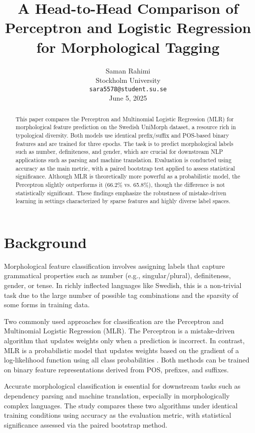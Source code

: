 \documentclass[11pt]{article}
\title{A Head-to-Head Comparison of Perceptron and Logistic Regression for Morphological Tagging}
\author{
  Saman Rahimi \\
  Stockholm University \\
  \texttt{sara5578@student.su.se} \\
  \textnormal{June 5, 2025}
}
\begin{document}
\maketitle

\begin{abstract}
This paper compares the Perceptron and Multinomial Logistic Regression (MLR) for morphological feature prediction on the Swedish UniMorph dataset, a resource rich in typological diversity. Both models use identical prefix/suffix and POS-based binary features and are trained for three epochs. The task is to predict morphological labels such as number, definiteness, and gender, which are crucial for downstream NLP applications such as parsing and machine translation. Evaluation is conducted using accuracy as the main metric, with a paired bootstrap test applied to assess statistical significance. Although MLR is theoretically more powerful as a probabilistic model, the Perceptron slightly outperforms it (66.2\% vs. 65.8\%), though the difference is not statistically significant. These findings emphasize the robustness of mistake-driven learning in settings characterized by sparse features and highly diverse label spaces.
\end{abstract}

\section{Background}
Morphological feature classification involves assigning labels that capture grammatical properties such as number (e.g., singular/plural), definiteness, gender, or tense. In richly inflected languages like Swedish, this is a non-trivial task due to the large number of possible tag combinations and the sparsity of some forms in training data.

Two commonly used approaches for classification are the Perceptron and Multinomial Logistic Regression (MLR). The Perceptron is a mistake-driven algorithm that updates weights only when a prediction is incorrect. In contrast, MLR is a probabilistic model that updates weights based on the gradient of a log-likelihood function using all class probabilities \cite{jurafsky2024slp3}. Both methods can be trained on binary feature representations derived from POS, prefixes, and suffixes.

Accurate morphological classification is essential for downstream tasks such as dependency parsing and machine translation, especially in morphologically complex languages. The study compares these two algorithms under identical training conditions using accuracy as the evaluation metric, with statistical significance assessed via the paired bootstrap method.
\end{document}
